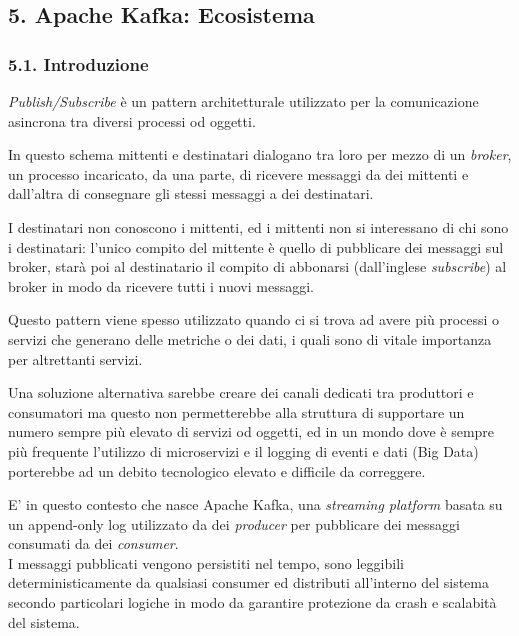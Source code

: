 \documentclass[]{article}
\begin{document}
\newpage

\subsection{5. Apache Kafka: Ecosistema}\label{apache-kafka-ecosistema}

\subsubsection{5.1. Introduzione}\label{introduzione-1}

\emph{Publish/Subscribe} è un pattern architetturale utilizzato per la
comunicazione asincrona tra diversi processi od oggetti.

In questo schema mittenti e destinatari dialogano tra loro per mezzo di
un \emph{broker}, un processo incaricato, da una parte, di ricevere
messaggi da dei mittenti e dall'altra di consegnare gli stessi messaggi
a dei destinatari.

I destinatari non conoscono i mittenti, ed i mittenti non si interessano
di chi sono i destinatari: l'unico compito del mittente è quello di
pubblicare dei messaggi sul broker, starà poi al destinatario il compito
di abbonarsi (dall'inglese \emph{subscribe}) al broker in modo da
ricevere tutti i nuovi messaggi.

Questo pattern viene spesso utilizzato quando ci si trova ad avere più
processi o servizi che generano delle metriche o dei dati, i quali sono
di vitale importanza per altrettanti servizi.

Una soluzione alternativa sarebbe creare dei canali dedicati tra
produttori e consumatori ma questo non permetterebbe alla struttura di
supportare un numero sempre più elevato di servizi od oggetti, ed in un
mondo dove è sempre più frequente l'utilizzo di microservizi e il
logging di eventi e dati (Big Data) porterebbe ad un debito tecnologico
elevato e difficile da correggere.

E' in questo contesto che nasce Apache Kafka, una \emph{streaming
platform} basata su un append-only log utilizzato da dei \emph{producer}
per pubblicare dei messaggi consumati da dei \emph{consumer}.\\
I messaggi pubblicati vengono persistiti nel tempo, sono leggibili
deterministicamente da qualsiasi consumer ed distributi all'interno del
sistema secondo particolari logiche in modo da garantire protezione da
crash e scalabità del sistema.

\newpage
\end{document}
